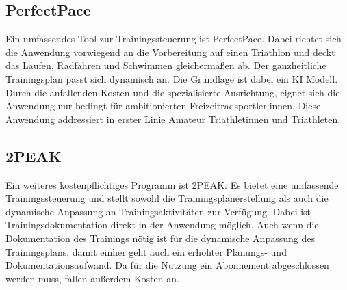 \subsection{PerfectPace}
Ein umfassendes Tool zur Trainingssteuerung ist PerfectPace\cite{PerfectPaceWeb}. Dabei richtet sich die Anwendung vorwiegend an die Vorbereitung auf einen Triathlon und deckt das Laufen, Radfahren und Schwimmen gleichermaßen ab. Der ganzheitliche Trainingsplan passt sich dynamisch an. Die Grundlage ist dabei ein KI Modell. Durch die anfallenden Kosten und die spezialisierte Ausrichtung, eignet sich die Anwendung nur bedingt für ambitionierten Freizeitradsportler:innen. Diese Anwendung addressiert in erster Linie Amateur Triathletinnen und Triathleten.

\subsection{2PEAK}
Ein weiteres kostenpflichtiges Programm ist 2PEAK\cite{2PeakWeb}. Es bietet eine umfassende Trainingssteuerung und stellt sowohl die Trainingsplanerstellung als auch die dynamische Anpassung an Trainingsaktivitäten zur Verfügung. Dabei ist Trainingsdokumentation direkt in der Anwendung möglich. Auch wenn die Dokumentation des Trainings nötig ist für die dynamische Anpassung des Trainingsplans, damit einher geht auch ein erhöhter Planungs- und Dokumentationsaufwand. Da für die Nutzung ein Abonnement abgeschlossen werden muss, fallen außerdem Kosten an.
